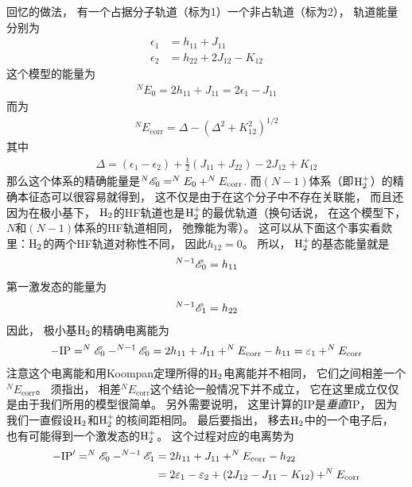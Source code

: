回忆的做法，
有一个占据分子轨道（标为1）一个非占轨道（标为2），
轨道能量分别为
\begin{subequations}
	\begin{align}
	\epsilon_1 & = h_{11} + J_{11}\\
	\epsilon_2 & = h_{22} + 2J_{12} - K_{12}
	\end{align}
\end{subequations}
这个模型的能量为
\begin{align}
^NE_0 = 2h_{11} + J_{11} = 2\epsilon_1 - J_{11}
\end{align}
而为
\begin{align}
^NE_\mathrm{corr} = \Delta - (\Delta^2 + K_{12}^2)^{1/2}
\end{align}
其中
\begin{align}
\Delta = (\epsilon_1 - \epsilon_2) + \frac{1}{2}(J_{11} + J_{22}) - 2J_{12} + K_{12}
\end{align}
那么这个体系的精确能量是$^N\mathscr{E}_0 = ^NE_0 + ^NE_\mathrm{corr}$. 
而$(N-1)$体系（即$\mathrm{H}_2^+$）的精确本征态可以很容易就得到，
这不仅是由于在这个分子中不存在关联能，
而且还因为在极小基下，
$\mathrm{H}_2$的HF轨道也是$\mathrm{H}_2^+$的最优轨道（换句话说，
在这个模型下，
$N$和$(N-1)$体系的HF轨道相同，
弛豫能为零）。
这可以从下面这个事实看欻里：$\mathrm{H}_2$的两个HF轨道对称性不同，
因此$h_{12}=0$。
所以，
$\mathrm{H}_2^+$的基态能量就是
\begin{align}
^{N-1}\mathscr{E}_0 = h_{11}
\end{align}
第一激发态的能量为
\begin{align}
^{N-1}\mathscr{E}_1 = h_{22}
\end{align}
因此，
极小基$\mathrm{H}_2$的精确电离能为
\begin{align}
-\mathrm{IP} = ^{N}\mathscr{E}_0 - ^{N-1}\mathscr{E}_0 = 2h_{11} + J_{11} + ^NE_\mathrm{corr} - h_{11} = \varepsilon_1 + ^NE_\mathrm{corr}
\end{align}
注意这个电离能和用Koompan定理所得的$\mathrm{H}_2$电离能并不相同，
它们之间相差一个$^NE_\mathrm{corr}$。
须指出，
相差$^NE_\mathrm{corr}$这个结论一般情况下并不成立，
它在这里成立仅仅是由于我们所用的模型很简单。
另外需要说明，
这里计算的IP是\emph{垂直}IP，
因为我们一直假设$\mathrm{H}_2$和$\mathrm{H}_2^+$的核间距相同。
最后要指出，
移去$\mathrm{H}_2$中的一个电子后，
也有可能得到一个激发态的$\mathrm{H}_2^+$。
这个过程对应的电离势为
\begin{align}
-\mathrm{IP}' = ^{N}\mathscr{E}_0 - ^{N-1}\mathscr{E}_1 &=  2h_{11} + J_{11} + ^NE_\mathrm{corr} - h_{22} \notag \\
& = 2\varepsilon_1 -\varepsilon_2 + (2J_{12} - J_{11} - K_{12}) + ^NE_\mathrm{corr} 
\label{7.52b}
\end{align}

